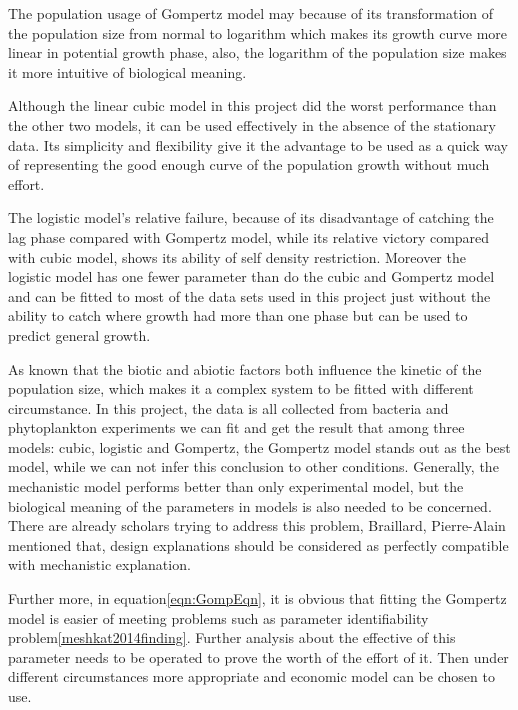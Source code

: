 \documentclass[11pt, a4paper]{article}
\begin{document}
The population usage of Gompertz model may because of its transformation of the population size from normal to logarithm which makes its growth curve more linear in potential growth phase\citep{buchanan1997simple}, also, the logarithm of the population size makes it more intuitive of biological meaning.

Although the linear cubic model in this project did the worst performance than the other two models, it can be used effectively in the absence of the stationary data\citep{buchanan1997simple}. Its simplicity and flexibility give it the advantage to be used as a quick way of representing the good enough curve of the population growth without much effort. 

The logistic model's relative failure, because of its disadvantage of catching the lag phase compared with Gompertz model, while its relative victory compared with cubic model, shows its ability of self density restriction\citep{eberhardt2008analyzing}. Moreover the logistic model has one fewer parameter than do the cubic and Gompertz model and can be fitted to most of the data sets used in this project just without the ability to catch where growth had more than one phase but can be used to predict general growth\citep{balmer2012evolution}. 

As known that the biotic and abiotic factors \citep{loreau1998biodiversity} both influence the kinetic of the population size, which makes it a complex system to be fitted with different circumstance. In this project, the data is all collected from bacteria and phytoplankton experiments we can fit and get the result that among three models: cubic, logistic and Gompertz, the Gompertz model stands out as the best model, while we can not infer this conclusion to other conditions. Generally, the mechanistic model performs better than only experimental model, but the biological meaning of the parameters in models is also needed to be concerned. There are already scholars trying to address this problem, Braillard, Pierre-Alain\citep{braillard2010systems} mentioned that, design explanations should be considered as perfectly compatible with mechanistic explanation.

Further more, in equation\ref{eqn:GompEqn}, it is obvious that fitting the Gompertz model is easier of meeting problems such as parameter identifiability problem\ref{meshkat2014finding}. Further analysis about the effective of this parameter needs to be operated to prove the worth of the effort of it. Then under different circumstances more appropriate and economic model can be chosen to use.


 
  


\end{document}
